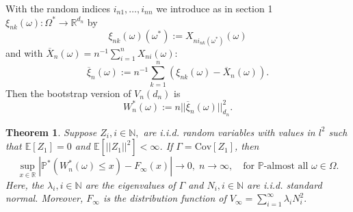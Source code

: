 \documentclass[sn-mathphys,Numbered]{sn-jnl}%
\theoremstyle{thmstyleone}%
\newtheorem{theorem}{Theorem}%
\theoremstyle{thmstyletwo}%
\theoremstyle{thmstylethree}%
\begin{document}
With the random indices $i_{n1},\ldots,i_{nn}$ we introduce as in section 1 $\xi_{nk}(\omega):\Omega^* \rightarrow \mathbb{R}^{d_n}$ by
$$
 \xi_{nk}(\omega)(\omega^*):= X_{n i_{nk}(\omega^*)}(\omega)
$$
and with $\overline{X}_n(\omega)=n^{-1} \sum_{i=1}^n X_{ni}(\omega)$:
$$
 \overline{\xi}_n(\omega):= n^{-1} \sum_{k=1}^n (\xi_{nk}(\omega)-\overline{X}_n(\omega)).
$$
Then the bootstrap version of $V_n(d_n)$ is $$W_n^*(\omega):=n||\overline{\xi}_n(\omega)||_{d_n}^2.$$

\begin{theorem} \label{bootstraphigh} Suppose $Z_i, i \in \mathbb{N},$ are i.i.d. random variables with values in $l^2$ such that
$\mathbb{E}[Z_1]=0$ and  $\mathbb{E}[||Z_1||^2] < \infty$. If $\Gamma = \text{Cov}[Z_1]$, then
\begin{equation} \label{uniformWnstar}
  \sup_{x \in \mathbb{R}}|\mathbb{P}^*(W_n^*(\omega) \le x)-F_\infty(x)| \rightarrow 0, \;  n \rightarrow \infty,\quad \text{for } \mathbb{P}\text{-almost all } \omega \in \Omega.
\end{equation}
Here, the $\lambda_i, i \in \mathbb{N}$ are the eigenvalues of $\Gamma$ and $N_i, i \in \mathbb{N}$ are i.i.d. standard normal. Moreover,  $F_\infty$ is the distribution function of $V_\infty=\sum_{i=1}^\infty \lambda_i N_i^2.$
\end{theorem}
\end{document}
